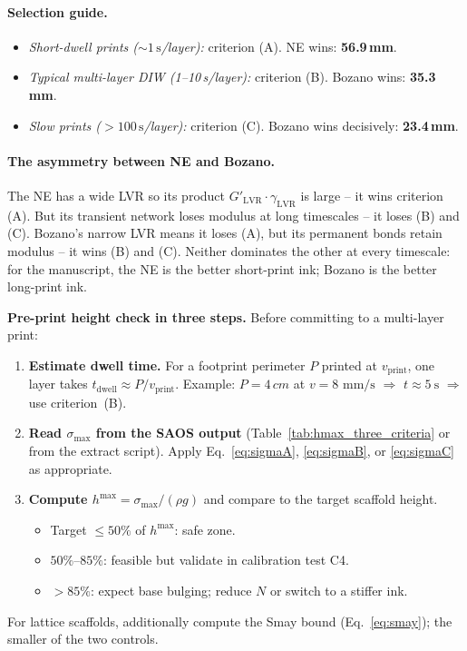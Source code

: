 \documentclass[11pt,a4paper]{article}
\newcommand{\mms}{\,\mathrm{mm/s}}
\begin{document}
\paragraph{Selection guide.}
\begin{itemize}[leftmargin=1.6em,itemsep=3pt]
\item \emph{Short-dwell prints ($\sim 1\,\si{\s}$/layer):} criterion (A).
  NE wins: \textbf{56.9\,\si{\mm}}.
\item \emph{Typical multi-layer DIW (1--10\,\si{\s}/layer):} criterion (B).
  Bozano wins: \textbf{35.3\,\si{\mm}}.
\item \emph{Slow prints ($>100\,\si{\s}$/layer):} criterion (C).
  Bozano wins decisively: \textbf{23.4\,\si{\mm}}.
\end{itemize}

\paragraph{The asymmetry between NE and Bozano.}
The NE has a wide LVR so its product $G'_\mathrm{LVR}\cdot\gamma_\mathrm{LVR}$
is large -- it wins criterion (A). But its transient network loses modulus
at long timescales -- it loses (B) and (C). Bozano's narrow LVR means
it loses (A), but its permanent bonds retain modulus -- it wins (B) and
(C). Neither dominates the other at every timescale: for the manuscript,
the NE is the better short-print ink; Bozano is the better long-print
ink.

\begin{inpracticebox}
\textbf{Pre-print height check in three steps.}
Before committing to a multi-layer print:
\begin{enumerate}[leftmargin=1.8em,itemsep=2pt]
\item \textbf{Estimate dwell time.} For a footprint perimeter $P$ printed
  at $v_\mathrm{print}$, one layer takes $t_\mathrm{dwell}\approx P/v_\mathrm{print}$.
  Example: $P=4\,\si{cm}$ at $v=8\,\mms$ $\Rightarrow$ $t\approx\SI{5}{\s}$
  $\Rightarrow$ use criterion~(B).
\item \textbf{Read $\sigma_\mathrm{max}$ from the SAOS output} (Table~\ref{tab:hmax_three_criteria}
  or from the extract script).  Apply Eq.~\eqref{eq:sigmaA},
  \eqref{eq:sigmaB}, or \eqref{eq:sigmaC} as appropriate.
\item \textbf{Compute $h^{\max}=\sigma_\mathrm{max}/(\rho g)$} and compare
  to the target scaffold height.
  \begin{itemize}[leftmargin=1.2em,itemsep=1pt]
  \item Target $\leq 50\%$ of $h^{\max}$: safe zone.
  \item $50\%$--$85\%$: feasible but validate in calibration test C4.
  \item $>85\%$: expect base bulging; reduce $N$ or switch to a
    stiffer ink.
  \end{itemize}
\end{enumerate}
For lattice scaffolds, additionally compute the Smay bound
(Eq.~\ref{eq:smay}); the smaller of the two controls.
\end{inpracticebox}
\end{document}
